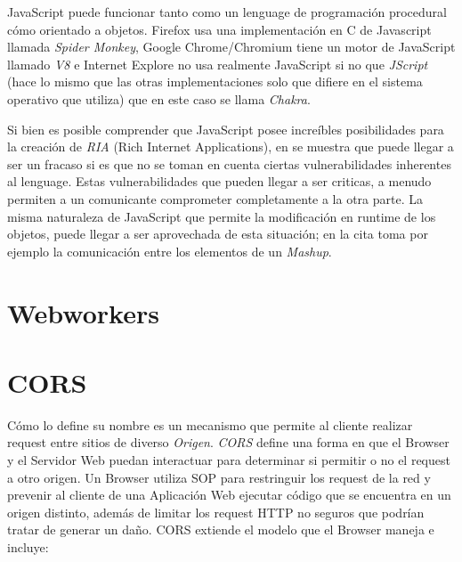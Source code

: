         JavaScript puede funcionar tanto como un lenguage de programación procedural cómo orientado a objetos. Firefox usa una implementación en C de Javascript llamada \textit{Spider Monkey}, Google Chrome/Chromium tiene un motor de JavaScript llamado \textit{V8} e Internet Explore no usa realmente JavaScript si no que \textit{JScript} (hace lo mismo que las otras implementaciones solo que difiere en el sistema operativo que utiliza) que en este caso se llama \textit{Chakra}.
        
        Si bien es posible comprender que JavaScript posee increíbles posibilidades para la creación de \textit{RIA} (Rich Internet Applications), en \cite{barth2009attacks} se muestra que puede llegar a ser un fracaso si es que no se toman en cuenta ciertas vulnerabilidades inherentes al lenguage. Estas vulnerabilidades que pueden llegar a ser criticas, a menudo permiten a un comunicante comprometer completamente a la otra parte. La misma naturaleza de JavaScript que permite la modificación en runtime de los objetos, puede llegar a ser aprovechada de esta situación; en la cita toma por ejemplo la comunicación entre los elementos de un \textit{Mashup}.

\section{Webworkers}

\section{CORS}
Cómo lo define su nombre es un mecanismo que permite al cliente realizar request entre sitios de diverso \textit{Origen}. \textit{CORS} define una forma en que el Browser y el Servidor Web puedan interactuar para determinar si permitir o no el request a otro origen. Un Browser utiliza SOP para restringuir los request de la red y prevenir al cliente de una Aplicación Web ejecutar código que se encuentra en un origen distinto, además de limitar los request HTTP no seguros que podrían tratar de generar un daño. CORS extiende el modelo que el Browser maneja e incluye:
    
